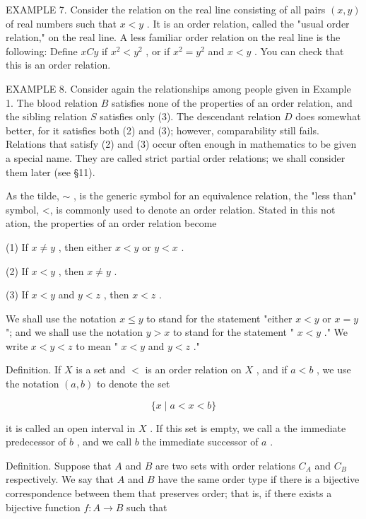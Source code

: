 \documentclass[10pt]{article}
\begin{document}
EXAMPLE 7. Consider the relation on the real line consisting of all pairs \(\left( {x,y}\right)\) of real numbers such that \(x < y\) . It is an order relation, called the "usual order relation," on the real line. A less familiar order relation on the real line is the following: Define \({xCy}\) if \({x}^{2} < {y}^{2}\) , or if \({x}^{2} = {y}^{2}\) and \(x < y\) . You can check that this is an order relation.

EXAMPLE 8. Consider again the relationships among people given in Example 1. The blood relation \(B\) satisfies none of the properties of an order relation, and the sibling relation \(S\) satisfies only (3). The descendant relation \(D\) does somewhat better, for it satisfies both (2) and (3); however, comparability still fails. Relations that satisfy (2) and (3) occur often enough in mathematics to be given a special name. They are called strict partial order relations; we shall consider them later (see §11).

As the tilde, \(\sim\) , is the generic symbol for an equivalence relation, the "less than" symbol, <, is commonly used to denote an order relation. Stated in this not ation, the properties of an order relation become

(1) If \(x \neq  y\) , then either \(x < y\) or \(y < x\) .

(2) If \(x < y\) , then \(x \neq  y\) .

(3) If \(x < y\) and \(y < z\) , then \(x < z\) .

We shall use the notation \(x \leq  y\) to stand for the statement "either \(x < y\) or \(x = y\) "; and we shall use the notation \(y > x\) to stand for the statement " \(x < y\) ." We write \(x < y < z\) to mean " \(x < y\) and \(y < z\) ."

Definition. If \(X\) is a set and \(<\) is an order relation on \(X\) , and if \(a < b\) , we use the notation \(\left( {a,b}\right)\) to denote the set

\[
\{ x \mid  a < x < b\}
\]

it is called an open interval in \(X\) . If this set is empty, we call a the immediate predecessor of \(b\) , and we call \(b\) the immediate successor of \(a\) .

Definition. Suppose that \(A\) and \(B\) are two sets with order relations \({C}_{A}\) and \({C}_{B}\) respectively. We say that \(A\) and \(B\) have the same order type if there is a bijective correspondence between them that preserves order; that is, if there exists a bijective function \(f : A \rightarrow  B\) such that
\end{document}
